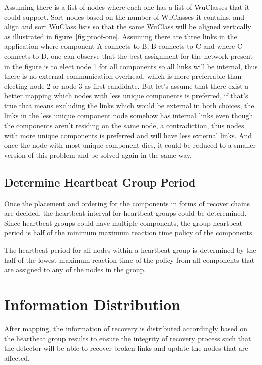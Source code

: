 Assuming there is a list of nodes where each one has a list of WuClasses that
it could support. Sort nodes based on the number of WuClasses it contains, and
align and sort WuClass lists so that the same WuClass will be aligned
vertically as illustrated in figure~\ref{fig:proof-one}. Assuming there are
three links in the application where component A connects to B, B connects to 
C and where C connects to D, one can observe that the best assignment for the
network present in the figure is to elect node 1 for all components so all
links will be internal, thus there is no external communication overhead, which
is more preferrable than electing node 2 or node 3 as first candidate. But
let's assume that there exist a better mapping which nodes with less unique
components is preferred, if that's true that means excluding the links which
would be external in both choices, the links in the less unique component node
somehow has internal links even though the components aren't residing on the
same node, a contradiction, thus nodes with more unique components is preferred
and will have less external links. And once the node with most unique component
dies, it could be reduced to a smaller version of this problem and be solved
again in the same way.


\subsection{Determine Heartbeat Group Period}

Once the placement and ordering for the components in forms of recover chains
are decided, the heartbeat interval for heartbeat groups could be deteremined.
Since heartbeat groups could have multiple components, the group heartbeat
period is half of the minimum maximum reaction time policy of the components.

The heartbeat period for all nodes within a heartbeat group is determined by
the half of the lowest maximum reaction time of the policy from all components
that are assigned to any of the nodes in the group.

\section{Information Distribution}

After mapping, the information of recovery is distributed accordingly based on
the heartbeat group results to ensure the integrity of recovery process such
that the detector will be able to recover broken links and update the nodes
that are affected.

